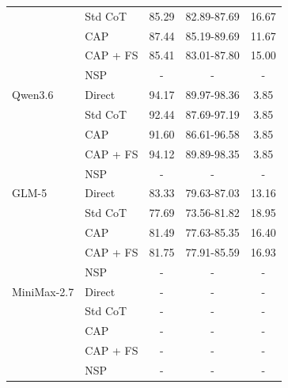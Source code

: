 \documentclass{article}
\theoremstyle{plain}
\theoremstyle{definition}
\theoremstyle{remark}
\begin{document}
\begin{table}[t]
\begin{minipage}[t]{0.45\textwidth}
\begin{footnotesize}
\begin{tabular}{llccc}
         & Std CoT & 85.29 & 82.89-87.69 & 16.67 \\
         & CAP & 87.44 & 85.19-89.69 & 11.67 \\
         & CAP + FS & 85.41 & 83.01-87.80 & 15.00 \\
         & NSP & - & - & - \\
        \midrule
        Qwen3.6 & Direct & 94.17 & 89.97-98.36 & 3.85 \\
         & Std CoT & 92.44 & 87.69-97.19 & 3.85 \\
         & CAP & 91.60 & 86.61-96.58 & 3.85 \\
         & CAP + FS & 94.12 & 89.89-98.35 & 3.85 \\
         & NSP & - & - & - \\
        \midrule
        GLM-5 & Direct & 83.33 & 79.63-87.03 & 13.16 \\
         & Std CoT & 77.69 & 73.56-81.82 & 18.95 \\
         & CAP & 81.49 & 77.63-85.35 & 16.40 \\
         & CAP + FS & 81.75 & 77.91-85.59 & 16.93 \\
         & NSP & - & - & - \\
        \midrule
        MiniMax-2.7 & Direct & - & - & - \\
         & Std CoT & - & - & - \\
         & CAP & - & - & - \\
         & CAP + FS & - & - & - \\
         & NSP & - & - & - \\
        \bottomrule
      \end{tabular}

      \vskip 0.1in


\end{footnotesize}
\end{minipage}
\end{table}
\end{document}
